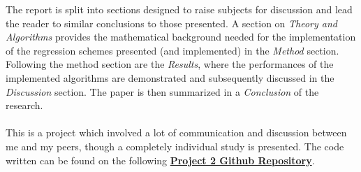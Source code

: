     The report is split into sections designed to raise subjects for discussion and lead the reader to similar conclusions to those presented. A section on \textit{Theory and Algorithms} provides the mathematical background needed for the implementation of the regression schemes presented (and implemented) in the \textit{Method} section. Following the method section are the \textit{Results}, where the performances of the implemented algorithms are demonstrated and subsequently discussed in the \textit{Discussion} section. The paper is then summarized in a \textit{Conclusion} of the research.\\\\
    This is a project which involved a lot of communication and discussion between me and my peers, though a completely individual study is presented. The code written can be found on the following \href{https://github.com/steinnhauser/Neural-Networks/tree/master/FYS-STK4155/Project2}{\textbf{Project 2 Github Repository}}. 